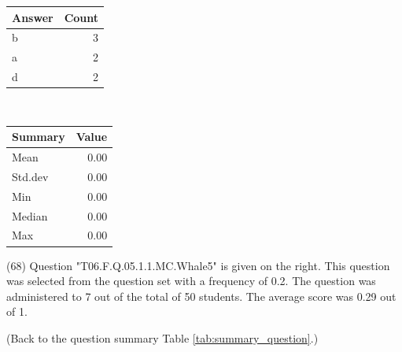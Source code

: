 \documentclass[12pt,english,nohyper]{tufte-handout}\usepackage[]{graphicx}\usepackage[]{color}
\begin{document}
\begin{center}%
\begin{tabular}{lr}
  \hline
Answer & Count \\ 
  \hline
b &   3 \\ 
  a &   2 \\ 
  d &   2 \\ 
   \hline
\end{tabular}
~~~~~~~~%
\begin{tabular}{lr}
  \hline
Summary & Value \\ 
  \hline
Mean & 0.00 \\ 
  Std.dev & 0.00 \\ 
  Min & 0.00 \\ 
  Median & 0.00 \\ 
  Max & 0.00 \\ 
   \hline
\end{tabular}
\end{center}\newpage{} (68) Question "T06.F.Q.05.1.1.MC.Whale5" is given on the right. This question was selected from the question set with a frequency of 0.2. The question was administered to 7 out of the total of 50 students. The average score was 0.29 out of 1.

 (Back to the question summary Table \ref{tab:summary_question}.)
\end{document}

